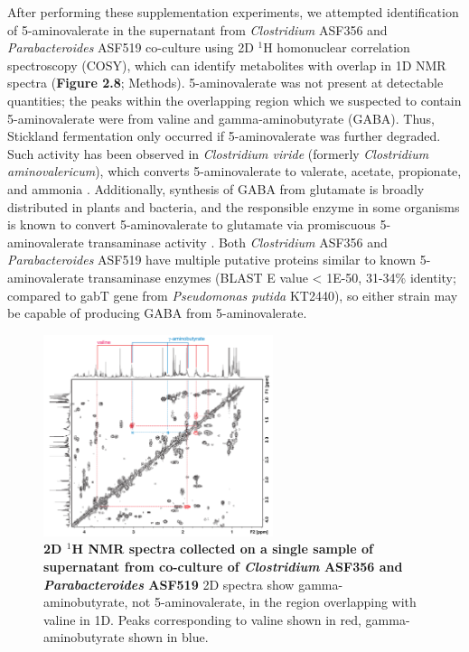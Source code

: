 \documentclass[11pt,twocolumn,notitlepage,openany,twoside]{book}
\begin{document}
\begin{refsection}
After performing these supplementation experiments, we attempted identification of 5-aminovalerate in the supernatant from \textit{Clostridium} ASF356 and \textit{Parabacteroides} ASF519 co-culture using 2D $^1\!$H homonuclear correlation spectroscopy (COSY), which can identify metabolites with overlap in 1D NMR spectra (\textbf{Figure 2.8}; Methods). 5-aminovalerate was not present at detectable quantities; the peaks within the overlapping region which we suspected to contain 5-aminovalerate were from valine and gamma-aminobutyrate (GABA). Thus, Stickland fermentation only occurred if 5-aminovalerate was further degraded. Such activity has been observed in \textit{Clostridium viride} (formerly \textit{Clostridium aminovalericum}), which converts 5-aminovalerate to valerate, acetate, propionate, and ammonia \cite{Barker1985-rs,Barker1987-jt}. Additionally, synthesis of GABA from glutamate is broadly distributed in plants and bacteria, and the responsible enzyme in some organisms is known to convert 5-aminovalerate to glutamate via promiscuous 5-aminovalerate transaminase activity \cite{Shin2016-vy,Yonaha1985-xp}. Both \textit{Clostridium} ASF356 and \textit{Parabacteroides} ASF519 have multiple putative proteins similar to known 5-aminovalerate transaminase enzymes (BLAST E value \textless\! 1E-50, 31-34\% identity; compared to gabT gene from \textit{Pseudomonas putida} KT2440), so either strain may be capable of producing GABA from 5-aminovalerate.

\begin{figure}[tb]
\centering
\includegraphics[width=0.6\textwidth]{ch2_figS5}
\caption[2D $^1\!$H NMR spectra collected on a single sample of supernatant from co-culture of \textit{Clostridium} ASF356 and \textit{Parabacteroides} ASF519]{\textbf{2D $^1\!$H NMR spectra collected on a single sample of supernatant from co-culture of \textit{Clostridium} ASF356 and \textit{Parabacteroides} ASF519} 2D spectra show gamma-aminobutyrate, not 5-aminovalerate, in the region overlapping with valine in 1D. Peaks corresponding to valine shown in red, gamma-aminobutyrate shown in blue.}
\end{figure}


\end{refsection}
\end{document}
